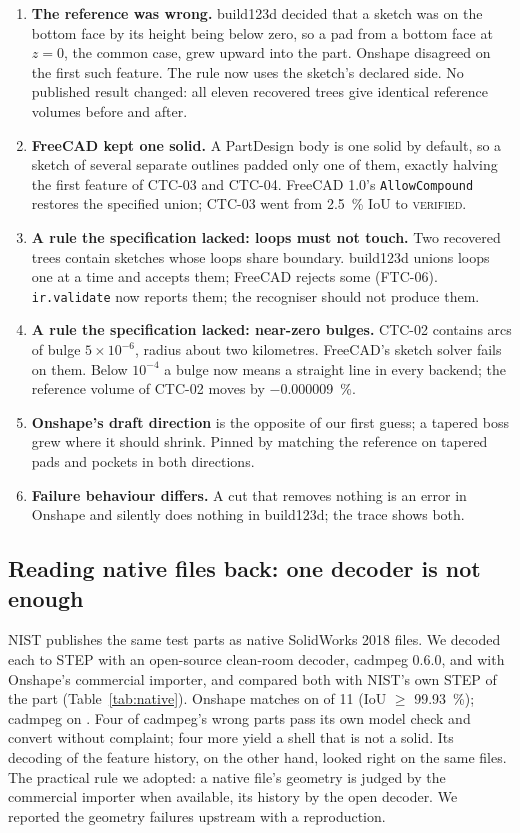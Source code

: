 \documentclass[11pt]{article}
\newcommand{\code}[1]{\texttt{\small #1}}
\newcommand{\VERIFIED}{\textsc{verified}}
\begin{document}
\begin{enumerate}
\item \textbf{The reference was wrong.} build123d decided that a sketch was on
  the bottom face by its height being below zero, so a pad from a bottom face at
  $z=0$, the common case, grew upward into the part. Onshape disagreed on the
  first such feature. The rule now uses the sketch's declared side. No published
  result changed: all eleven recovered trees give identical reference volumes
  before and after.
\item \textbf{FreeCAD kept one solid.} A PartDesign body is one solid by
  default, so a sketch of several separate outlines padded only one of them,
  exactly halving the first feature of CTC-03 and CTC-04. FreeCAD 1.0's
  \code{AllowCompound} restores the specified union; CTC-03 went from
  \SI{2.5}{\percent} IoU to \VERIFIED{}.
\item \textbf{A rule the specification lacked: loops must not touch.} Two
  recovered trees contain sketches whose loops share boundary. build123d unions
  loops one at a time and accepts them; FreeCAD rejects some (FTC-06).
  \code{ir.validate} now reports them; the recogniser should not produce them.
\item \textbf{A rule the specification lacked: near-zero bulges.} CTC-02 contains
  arcs of bulge $5\times10^{-6}$, radius about two kilometres. FreeCAD's sketch
  solver fails on them. Below $10^{-4}$ a bulge now means a straight line in
  every backend; the reference volume of CTC-02 moves by
  \SI{-0.000009}{\percent}.
\item \textbf{Onshape's draft direction} is the opposite of our first guess;
  a tapered boss grew where it should shrink. Pinned by matching the reference on
  tapered pads and pockets in both directions.
\item \textbf{Failure behaviour differs.} A cut that removes nothing is an error
  in Onshape and silently does nothing in build123d; the trace shows both.
\end{enumerate}

\subsection{Reading native files back: one decoder is not enough}\label{sec:native}

NIST publishes the same test parts as native SolidWorks 2018 files. We decoded
each to STEP with an open-source clean-room decoder, cadmpeg 0.6.0, and with
Onshape's commercial importer, and compared both with NIST's own STEP of the
part (Table~\ref{tab:native}). Onshape matches on \NatOnshape{} of 11 (IoU
$\geq$ \SI{99.93}{\percent}); cadmpeg on \NatCadmpeg{}. Four of cadmpeg's
wrong parts pass its own model check and convert without complaint; four more
yield a shell that is not a solid. Its decoding of the feature history, on the
other hand, looked right on the same files. The practical rule we adopted: a
native file's geometry is judged by the commercial importer when available, its
history by the open decoder. We reported the geometry failures upstream with a
reproduction.
\end{document}

